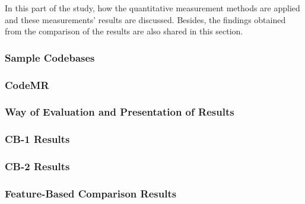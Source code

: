 In this part of the study, how the quantitative measurement methods are applied and these measurements' results are discussed. Besides, the findings obtained from the comparison of the results are also shared in this section.

\subsubsection{Sample Codebases}
\label{section:5.3.1}


\subsubsection{CodeMR}


\subsubsection{Way of Evaluation and Presentation of Results}


\subsubsection{CB-1 Results}


\subsubsection{CB-2 Results}


\subsubsection{Feature-Based Comparison Results}

